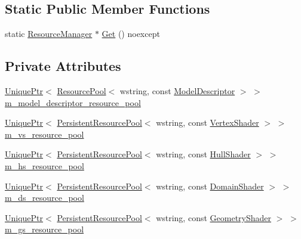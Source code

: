 \subsection*{Static Public Member Functions}
\begin{DoxyCompactItemize}
\item 
static \hyperlink{classmage_1_1_resource_manager}{Resource\+Manager} $\ast$ \hyperlink{classmage_1_1_resource_manager_a1e6ca77d892578fc4df0e62dfbc807f6}{Get} () noexcept
\end{DoxyCompactItemize}
\subsection*{Private Attributes}
\begin{DoxyCompactItemize}
\item 
\hyperlink{namespacemage_a3316d7143a973e37adf1110f2e80ca31}{Unique\+Ptr}$<$ \hyperlink{classmage_1_1_resource_pool}{Resource\+Pool}$<$ wstring, const \hyperlink{classmage_1_1_model_descriptor}{Model\+Descriptor} $>$ $>$ \hyperlink{classmage_1_1_resource_manager_a57aab278f875724e43b48a9e9885ccea}{m\+\_\+model\+\_\+descriptor\+\_\+resource\+\_\+pool}
\item 
\hyperlink{namespacemage_a3316d7143a973e37adf1110f2e80ca31}{Unique\+Ptr}$<$ \hyperlink{classmage_1_1_persistent_resource_pool}{Persistent\+Resource\+Pool}$<$ wstring, const \hyperlink{classmage_1_1_vertex_shader}{Vertex\+Shader} $>$ $>$ \hyperlink{classmage_1_1_resource_manager_a6f0d2bfba2cbf0586572d100ee06c7f7}{m\+\_\+vs\+\_\+resource\+\_\+pool}
\item 
\hyperlink{namespacemage_a3316d7143a973e37adf1110f2e80ca31}{Unique\+Ptr}$<$ \hyperlink{classmage_1_1_persistent_resource_pool}{Persistent\+Resource\+Pool}$<$ wstring, const \hyperlink{namespacemage_a964e5e384b0e55ac900c819da48b6000}{Hull\+Shader} $>$ $>$ \hyperlink{classmage_1_1_resource_manager_a8f5118a694baef442f467ef8658f93b6}{m\+\_\+hs\+\_\+resource\+\_\+pool}
\item 
\hyperlink{namespacemage_a3316d7143a973e37adf1110f2e80ca31}{Unique\+Ptr}$<$ \hyperlink{classmage_1_1_persistent_resource_pool}{Persistent\+Resource\+Pool}$<$ wstring, const \hyperlink{namespacemage_aef8cda73e2387cb89baa6c54a7fea542}{Domain\+Shader} $>$ $>$ \hyperlink{classmage_1_1_resource_manager_aa58be0018fe4f93182927a84bca407f4}{m\+\_\+ds\+\_\+resource\+\_\+pool}
\item 
\hyperlink{namespacemage_a3316d7143a973e37adf1110f2e80ca31}{Unique\+Ptr}$<$ \hyperlink{classmage_1_1_persistent_resource_pool}{Persistent\+Resource\+Pool}$<$ wstring, const \hyperlink{namespacemage_a0cf0bb4b74903e78658c96412d5687a6}{Geometry\+Shader} $>$ $>$ \hyperlink{classmage_1_1_resource_manager_a2b0c4dfc6473c6c8aa9a0f3ebc30c1dd}{m\+\_\+gs\+\_\+resource\+\_\+pool}

\end{DoxyCompactItemize}

